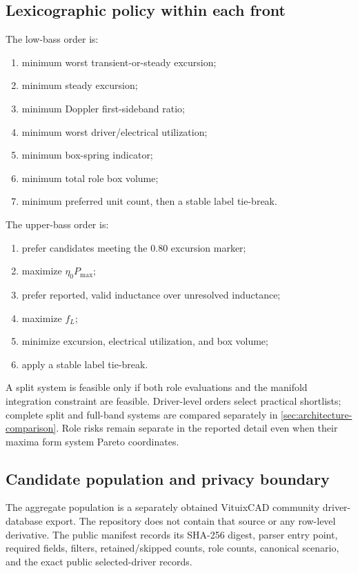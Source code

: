 \documentclass[11pt,a4paper]{article}
\numberwithin{equation}{section}
\newcommand{\Pmax}{P_{\mathrm{max}}}
\begin{document}
\subsection{Lexicographic policy within each front}

The low-bass order is:
\begin{enumerate}
	\item minimum worst transient-or-steady excursion;
	\item minimum steady excursion;
	\item minimum Doppler first-sideband ratio;
	\item minimum worst driver/electrical utilization;
	\item minimum box-spring indicator;
	\item minimum total role box volume;
	\item minimum preferred unit count, then a stable label tie-break.
\end{enumerate}

The upper-bass order is:
\begin{enumerate}
	\item prefer candidates meeting the $0.80$ excursion marker;
	\item maximize $\eta_0\Pmax$;
	\item prefer reported, valid inductance over unresolved inductance;
	\item maximize $f_L$;
	\item minimize excursion, electrical utilization, and box volume;
	\item apply a stable label tie-break.
\end{enumerate}

A split system is feasible only if both role evaluations and the manifold
integration constraint are feasible.  Driver-level orders select practical
shortlists; complete split and full-band systems are compared separately in
\cref{sec:architecture-comparison}.  Role risks remain separate in the
reported detail even when their maxima form system Pareto coordinates.

\subsection{Candidate population and privacy boundary}
\label{sec:database}

The aggregate population is a separately obtained VituixCAD community
driver-database export.  The repository does not contain that source or any
row-level derivative.  The public manifest records its SHA-256 digest,
parser entry point, required fields, filters, retained/skipped counts, role
counts, canonical scenario, and the exact public selected-driver records.
\end{document}

